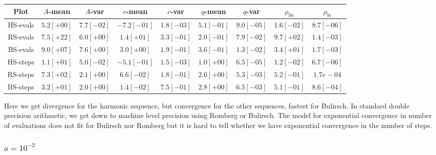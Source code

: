 \begin{table}[H]
    \centering
        \small
    \begin{tabular}{c||c|c|c|c|c|c|c|c}
Plot & \(A\)-mean & \(A\)-var & \(c\)-mean & \(c\)-var & \(q\)-mean & \(q\)-var & \(\rho_{\operatorname{lin}}\) & \(\rho_{\ln}\)\\\hline
\rowcolor{red}
HS-evals & \(5.2[+00]\) & \(7.7[-02]\) & \(-7.2[-01]\) & \(1.8[-03]\) & \(5.1[-01]\) & \(9.0[-05]\) & \(1.6[-02]\) & \(8.7[-06]\) \\
\rowcolor{red}
RS-evals & \(7.5[+22]\) & \(6.0[+00]\) & \(1.4[+01]\) & \(3.3[-01]\) & \(2.0[-01]\) & \(7.9[-02]\) & \(9.7[+02]\) & \(1.4[-03]\) \\
\rowcolor{red}
BS-evals & \(9.0[+07]\) & \(7.6[+00]\) & \(3.0[+00]\) & \(1.9[-01]\) & \(3.6[-01]\) & \(1.3[-02]\) & \(3.4[+01]\) & \(1.7[-03]\) \\
\rowcolor{red}
HS-steps & \(1.1[+01]\) & \(5.0[-02]\) & \(-5.1[-01]\) & \(1.5[-03]\) & \(1.0[+00]\) & \(6.5[-05]\) & \(1.2[-02]\) & \(6.7[-06]\) \\
\rowcolor{yellow}
RS-steps & \(7.3[+02]\) & \(2.1[+00]\) & \(6.6[-02]\) & \(1.8[-01]\) & \(2.6[+00]\) & \(5.3[-03]\) & \(5.2[-01]\) & \(1.7e-04\) \\
\rowcolor{yellow}
BS-steps & \(3.2[+01]\) & \(2.0[+00]\) & \(1.4[-02]\) & \(7.5[-01]\) & \(2.8[+00]\) & \(6.5[-03]\) & \(5.1[-01]\) & \(8.6[-04]\) \\
    \end{tabular}
    \label{tab:my_label}
\end{table}

Here we get divergence for the harmonic sequence, but convergence for the other sequences, fastest for Bulirsch. In standard double precision arithmetic, we get down to machine level precision using Romberg or Bulirsch. The model for exponential convergence in number of evaluations does not fit for Bulirsch nor Romberg but it is hard to tell whether we have exponential convergence in the number of steps.

\subsubsection{\(a = 10^{-2}\)}

